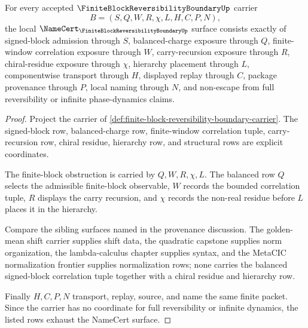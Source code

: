 \begin{theorem}
\label{thm:finite-block-reversibility-boundary-namecert-obligations}
For every accepted $\FiniteBlockReversibilityBoundaryUp$ carrier
$$
B=(S,Q,W,R,\chi,L,H,C,P,N),
$$
the local $\NameCert_{\FiniteBlockReversibilityBoundaryUp}$ surface consists exactly of signed-block admission through $S$, balanced-charge exposure through $Q$, finite-window correlation exposure through $W$, carry-recursion exposure through $R$, chiral-residue exposure through $\chi$, hierarchy placement through $L$, componentwise transport through $H$, displayed replay through $C$, package provenance through $P$, local naming through $N$, and non-escape from full reversibility or infinite phase-dynamics claims.
\end{theorem}
\begin{proof}
Project the carrier of \autoref{def:finite-block-reversibility-boundary-carrier}. The signed-block row, balanced-charge row, finite-window correlation tuple, carry-recursion row, chiral residue, hierarchy row, and structural rows are explicit coordinates.

The finite-block obstruction is carried by $Q,W,R,\chi,L$. The balanced row $Q$ selects the admissible finite-block observable, $W$ records the bounded correlation tuple, $R$ displays the carry recursion, and $\chi$ records the non-real residue before $L$ places it in the hierarchy.

Compare the sibling surfaces named in the provenance discussion. The golden-mean shift carrier supplies shift data, the quadratic capstone supplies norm organization, the lambda-calculus chapter supplies syntax, and the MetaCIC normalization frontier supplies normalization rows; none carries the balanced signed-block correlation tuple together with a chiral residue and hierarchy row.

Finally $H,C,P,N$ transport, replay, source, and name the same finite packet. Since the carrier has no coordinate for full reversibility or infinite dynamics, the listed rows exhaust the NameCert surface.
\end{proof}

